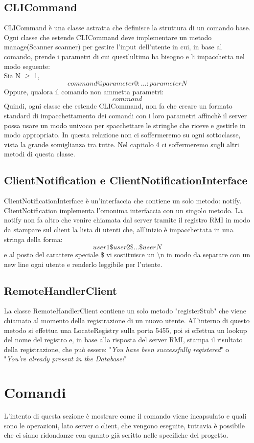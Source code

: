 \documentclass[]{article}
\begin{document}
\subsection{CLICommand}
CLICommand è una classe astratta che definisce la struttura di un comando base.
Ogni classe che estende CLICommand deve implementare un metodo manage(Scanner scanner) per gestire l'input dell'utente in cui, in base al comando, prende i parametri di cui quest'ultimo ha bisogno e li impacchetta nel modo seguente:\\
Sia N $\geq$ 1,
$$command@parameter0:...:parameterN$$
Oppure, qualora il comando non ammetta parametri:
$$command$$
Quindi, ogni classe che estende CLICommand, non fa che creare un formato standard di impacchettamento dei comandi con i loro parametri affinchè il server possa usare un modo univoco per spacchettare le stringhe che riceve e gestirle in modo appropriato.
In questa relazione non ci soffermeremo su ogni sottoclasse, vista la grande somiglianza tra tutte.
Nel capitolo 4 ci soffermeremo sugli altri metodi di questa classe.
\subsection{ClientNotification e ClientNotificationInterface}
ClientNotificationInterface è un'interfaccia che contiene un solo metodo: notify.
ClientNotification implementa l'omonima interfaccia con un singolo metodo.
La notify non fa altro che venire chiamata dal server tramite il registro RMI in modo da stampare sul client la lista di utenti che, all'inizio è impacchettata in una stringa della forma:
$$user1\$user2\$...\$userN$$
e al posto del carattere speciale \$ vi sostituisce un \textbackslash n in modo da separare con un new line ogni utente e renderlo leggibile per l'utente.
\subsection{RemoteHandlerClient}
La classe RemoteHandlerClient contiene un solo metodo "registerStub" che viene chiamato al momento della registrazione di un nuovo utente. All'interno di questo metodo si effettua una LocateRegistry sulla porta 5455, poi si effettua un lookup del nome del registro e, in base alla risposta del server RMI, stampa il risultato della registrazione, che può essere:
"\textit{You have been successfully registered}" o "\textit{You're already present in the Database!}"
\section{Comandi}
L'intento di questa sezione è mostrare come il comando viene incapsulato e quali sono le operazioni, lato server o client, che vengono eseguite, tuttavia è possibile che ci siano ridondanze con quanto già scritto nelle specifiche del progetto.
\end{document}
